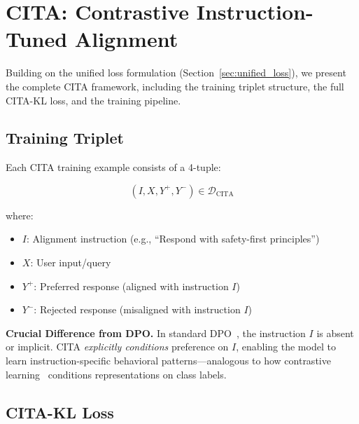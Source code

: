
\vspace{-2mm}
\section{CITA: Contrastive Instruction-Tuned Alignment}
\label{sec:cita_framework}

Building on the unified loss formulation (Section~\ref{sec:unified_loss}), we present the complete CITA framework, including the training triplet structure, the full CITA-KL loss, and the training pipeline.

\vspace{-2mm}
\subsection{Training Triplet}
\label{sec:training_triplet}

Each CITA training example consists of a 4-tuple:

\begin{equation}
(I, X, Y^+, Y^-) \in \mathcal{D}_{\text{CITA}}
\label{eq:triplet}
\end{equation}

where:
\begin{itemize}[leftmargin=*,itemsep=1pt]
    \item $I$: Alignment instruction (e.g., ``Respond with safety-first principles'')
    \item $X$: User input/query
    \item $Y^+$: Preferred response (aligned with instruction $I$)
    \item $Y^-$: Rejected response (misaligned with instruction $I$)
\end{itemize}

\textbf{Crucial Difference from DPO.} In standard DPO~\cite{rafailov2023direct}, the instruction $I$ is absent or implicit. CITA \textit{explicitly conditions} preference on $I$, enabling the model to learn instruction-specific behavioral patterns---analogous to how contrastive learning~\cite{chen2020simple,khosla2020supervised} conditions representations on class labels.

\vspace{-2mm}
\subsection{CITA-KL Loss}
\label{sec:cita_kl_loss}

